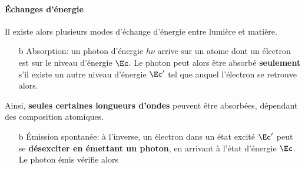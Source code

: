 \documentclass[../../main/main.tex]{subfiles}
\begin{document}
\paragraph*{Échanges d'énergie}
Il existe alors plusieurs modes d'échange d'énergie entre lumière et matière.
\smallbreak
\noindent
\begin{minipage}[t]{.70\linewidth}
	\begin{itemize}
		\item[b]{Absorption}: un photon d'énergie $h\nu$ arrive sur un atome dont un
		électron est sur le niveau d'énergie $\Ec$. Le photon peut alors être
		absorbé \textbf{seulement} s'il existe un autre niveau d'énergie $\Ec'$ tel
		que
		\psw{%
			\[
				\Delta{\Ec} = \Ec' - \Ec = h\nu
			\]
		}%
		auquel l'électron se retrouve alors.
		\bigbreak
	\end{itemize}
\end{minipage}
\hfill
\noindent
\begin{minipage}[t]{.25\linewidth}
	\vspace{0pt}
	\begin{center}
	\end{center}
\end{minipage}
Ainsi, \textbf{seules certaines longueurs d'ondes} peuvent être absorbées,
dépendant des composition atomiques.
\smallbreak
\noindent
\begin{minipage}[t]{.70\linewidth}
	\begin{itemize}
		\item[b]{Émission spontanée}: à l'inverse, un électron dans un état excité
		$\Ec'$ peut se \textbf{désexciter en émettant un photon}, en arrivant à
		l'état d'énergie $\Ec$. Le photon émis vérifie alors
		\psw{%
			\[
				\Delta{\Ec} = \Ec' - \Ec = h\nu
			\]
		}%
	\end{itemize}
\end{minipage}
\end{document}
